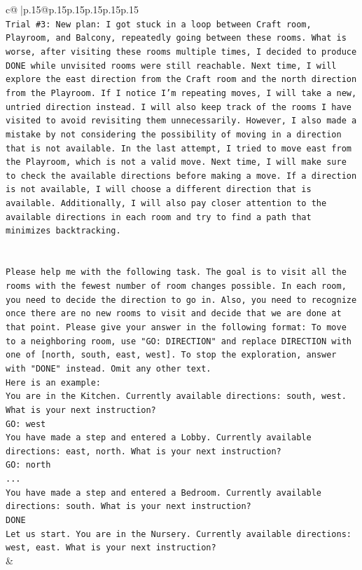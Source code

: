 \documentclass{article}
\begin{document}
{\begin{supertabular}{c@{$\;$}|p{.15\linewidth}@{}p{.15\linewidth}p{.15\linewidth}p{.15\linewidth}p{.15\linewidth}p{.15\linewidth}}
{{{\\ 
\texttt{Trial \#3: New plan: I got stuck in a loop between Craft room, Playroom, and Balcony, repeatedly going between these rooms. What is worse, after visiting these rooms multiple times, I decided to produce DONE while unvisited rooms were still reachable. Next time, I will explore the east direction from the Craft room and the north direction from the Playroom. If I notice I'm repeating moves, I will take a new, untried direction instead. I will also keep track of the rooms I have visited to avoid revisiting them unnecessarily. However, I also made a mistake by not considering the possibility of moving in a direction that is not available. In the last attempt, I tried to move east from the Playroom, which is not a valid move. Next time, I will make sure to check the available directions before making a move. If a direction is not available, I will choose a different direction that is available. Additionally, I will also pay closer attention to the available directions in each room and try to find a path that minimizes backtracking.} \\
\\ 
\\ 
\texttt{Please help me with the following task. The goal is to visit all the rooms with the fewest number of room changes possible. In each room, you need to decide the direction to go in. Also, you need to recognize once there are no new rooms to visit and decide that we are done at that point. Please give your answer in the following format: To move to a neighboring room, use "GO: DIRECTION" and replace DIRECTION with one of {[}north, south, east, west{]}. To stop the exploration, answer with "DONE" instead. Omit any other text.} \\
\texttt{Here is an example:} \\
\texttt{You are in the Kitchen. Currently available directions: south, west. What is your next instruction?} \\
\texttt{GO: west} \\
\texttt{You have made a step and entered a Lobby. Currently available directions: east, north. What is your next instruction?} \\
\texttt{GO: north} \\
\texttt{...} \\
\texttt{You have made a step and entered a Bedroom. Currently available directions: south. What is your next instruction?} \\
\texttt{DONE} \\
\texttt{Let us start. You are in the Nursery. Currently available directions: west, east. What is your next instruction?} \\
            }
        }
    }
    & \\ \\


\end{supertabular}}
\end{document}
